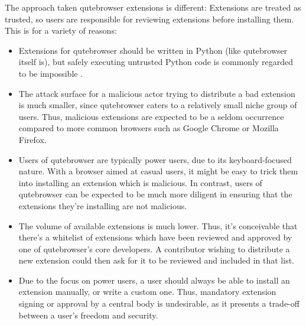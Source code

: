 \documentclass[a4paper,parskip=full]{scrreprt}
\begin{document}
The approach taken qutebrowser extensions is different: Extensions are treated
as trusted, so users are responsible for reviewing extensions before installing
them. This is for a variety of reasons:

\begin{itemize}
  \item Extensions for qutebrowser should be written in Python (like qutebrowser itself
    is), but safely executing untrusted Python code is commonly regarded to be
    impossible \citep{nedbat-eval, lwn-pysandbox}.
  \item The attack surface for a malicious actor trying to distribute a bad
    extension is much smaller, since qutebrowser caters to a relatively small
    niche group of users. Thus, malicious extensions are expected to be a seldom
    occurrence compared to more common browsers such as Google Chrome or Mozilla
    Firefox.
  \item Users of qutebrowser are typically power users, due to its
    keyboard-focused nature. With a browser aimed at casual users, it might be
    easy to trick them into installing an extension which is malicious. In
    contrast, users of qutebrowser can be expected to be much more diligent in ensuring that
    the extensions they're installing are not malicious.
  \item The volume of available extensions is much lower. Thus, it's conceivable
    that there's a whitelist of extensions which have been reviewed and approved
    by one of qutebrowser's core developers. A contributor wishing to distribute
    a new extension could then ask for it to be reviewed and included in that list.
  \item Due to the focus on power users, a user should always be able to
    install an extension manually, or write a custom one. Thus, mandatory
    extension signing or approval by a central body is undesirable, as it
    presents a trade-off between a user's freedom and security.
\end{itemize}

% 
% 
% 
% 
% 
% 
\end{document}
